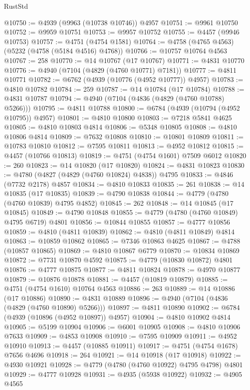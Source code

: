 \begin{lexlean}{RustStd}
\begin{coremodule}
@10750 := @4939 (@9963 (@10738 @10746)) @4957
@10751 := @9961 @10750
@10752 := @9959 @10751
@10753 := @9957 @10752
@10755 := @4457 (@9946 @10753)
@10757 := @4751 (@4754 @1581)
@10764 := @4758 (@4765 @4563) (@5232 (@4758 (@5184 @4516) @4768))
@10766 := @10757 @10764 @4563
@10767 := 258
@10770 := @14 @10767 (@17 @10767)
@10771 := @4831 @10770
@10776 := @4940 (@7104 (@4829 (@4760 @10771) @7181))
@10777 := @4811 @10771
@10782 := @6762 (@4939 (@10776 (@4952 @10777)) @4957)
@10783 := @4810 @10782
@10784 := 259
@10787 := @14 @10784 (@17 @10784)
@10788 := @4831 @10787
@10794 := @4940 (@7104 (@4836 (@4829 (@4760 @10788) @5266)))
@10795 := @4811 @10788
@10800 := @6784 (@4939 (@10794 (@4952 @10795)) @4957)
@10801 := @4810 @10800
@10803 := @7218 @5841 @4625
@10805 := @4810 @10803 @4814
@10806 := @5348 @10805
@10808 := @4810 @10806 @4814
@10809 := @7632 @10808
@10810 := @10801 @10809
@10811 := @10783 @10810
@10812 := @7595 @10811
@10813 := @4952 @10812
@10815 := @4457 (@10766 @10813)
@10819 := @4751 (@4754 @1601) @7509 @6012
@10820 := 260
@10823 := @14 @10820 (@17 @10820)
@10824 := @4831 @10823
@10830 := @4780 (@4827 (@4829 (@4760 @10824) @4838)) @4795
@10833 := @4846 (@7732 @2178) @4857
@10834 := @4810 @10833
@10835 := 261
@10838 := @14 @10835 (@17 @10835)
@10839 := @4790 @10838
@10844 := @4779 (@4780 (@4760 @10839) @4795 @4852)
@10845 := 262
@10848 := @14 @10845 (@17 @10845)
@10849 := @4790 @10848
@10855 := @4779 (@4780 (@4760 @10849) @4795 @6719) @4801
@10856 := @10844 @10855
@10857 := @4777 @10856
@10859 := @4810 (@4811 @10839)
@10862 := @4810 (@4811 @10849) @4814
@10863 := @10859 @10862
@10865 := @7346 @10863 @4625
@10867 := @4788 (@10857 @10865)
@10869 := @4810 @10867 @6779
@10870 := @10834 @10869
@10872 := @7731 @10870 @4592
@10875 := @4779 (@10830 @10872) @4801
@10876 := @4777 @10875
@10877 := @4811 @10824
@10878 := @4970 @10877
@10879 := @10876 @10878
@10881 := @4457 (@10819 @10879)
@10885 := @4751 (@4754 @1610) @10764 @4563
@10886 := 263
@10889 := @14 @10886 (@17 @10886)
@10890 := @4831 @10889
@10896 := @4940 (@7104 (@4836 (@4829 (@4760 @10890) @5266)))
@10897 := @4811 @10890
@10902 := @6784 (@4939 (@10896 (@4952 @10897)) @4957)
@10904 := @4810 @10902 @4814
@10905 := @5199 @10904
@10906 := @6001 @10905
@10908 := @4810 @10906 @7633
@10909 := @4853 @10908
@10910 := @7595 @10909
@10911 := @4952 @10910
@10913 := @4457 (@10885 @10911)
@10917 := @4751 (@4754 @1678) @7656 @4696
@10918 := 264
@10921 := @14 @10918 (@17 @10918)
@10922 := @4930 @10921
@10928 := @4779 (@4780 (@4760 @10922) @4795 @4798) @4801
@10929 := @4777 @10928
@10931 := @4935 (@5938 @10922)
@10932 := @4905 @4565

\end{coremodule}
\end{lexlean}
